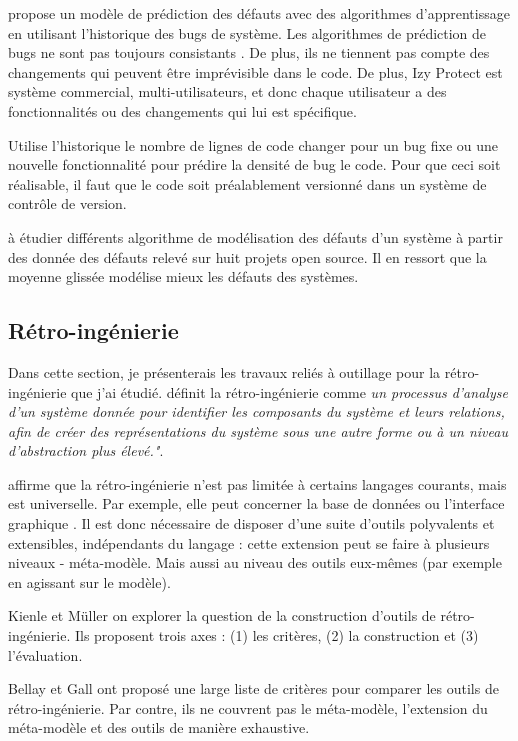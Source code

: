 \documentclass[a4paper]{article}
\begin{document}
\cite{kim07,Bibi06} propose un modèle de prédiction des défauts avec des algorithmes d'apprentissage en utilisant l'historique des bugs de système. 
Les algorithmes de prédiction de bugs ne sont pas toujours consistants \cite{bang19}. De plus, ils ne tiennent pas compte des changements qui peuvent être imprévisible dans le code. De plus, Izy Protect est système commercial, multi-utilisateurs, et donc chaque utilisateur a des fonctionnalités ou des changements qui lui est spécifique. 

\cite{naga05} Utilise l'historique le nombre de lignes de code changer pour un bug fixe ou une nouvelle fonctionnalité pour prédire la densité de bug le code. Pour que ceci soit réalisable, il faut que le code soit préalablement versionné dans un système de contrôle de version.

\cite{Raja09} à étudier différents algorithme de modélisation des défauts d'un système à partir des donnée des défauts relevé sur huit projets open source. Il en ressort que la moyenne glissée modélise mieux les défauts des systèmes.

\subsection{Rétro-ingénierie}
\label{sec:retroingenierie}
Dans cette section, je présenterais les travaux reliés à outillage pour la rétro-ingénierie que j'ai étudié.
\cite{Chik90a} définit la rétro-ingénierie comme \textit{un processus d'analyse d'un système donnée pour identifier les composants du système et leurs relations, afin de créer des représentations du système sous une autre forme ou à un niveau d'abstraction plus élevé."}.

\cite{Brun14c} affirme que la rétro-ingénierie n'est pas limitée à certains langages courants, mais est universelle. 
Par exemple, elle peut concerner la base de données \citep{Delp20a} ou l'interface graphique \citep{Verh19a}.
Il est donc nécessaire de disposer d'une suite d'outils polyvalents et extensibles, indépendants du langage : cette extension peut se faire à plusieurs niveaux - méta-modèle.
Mais aussi au niveau des outils eux-mêmes (par exemple en agissant sur le modèle).

Kienle et Müller \cite{Kien10a} on explorer la question de la construction d'outils de rétro-ingénierie.
Ils proposent trois axes : (1) les critères, (2) la construction et (3) l'évaluation.

Bellay et Gall \cite{Bell98a} ont proposé une large liste de critères pour comparer les outils de rétro-ingénierie.
Par contre, ils ne couvrent pas le méta-modèle, l'extension du méta-modèle et des outils de manière exhaustive.
\end{document}
